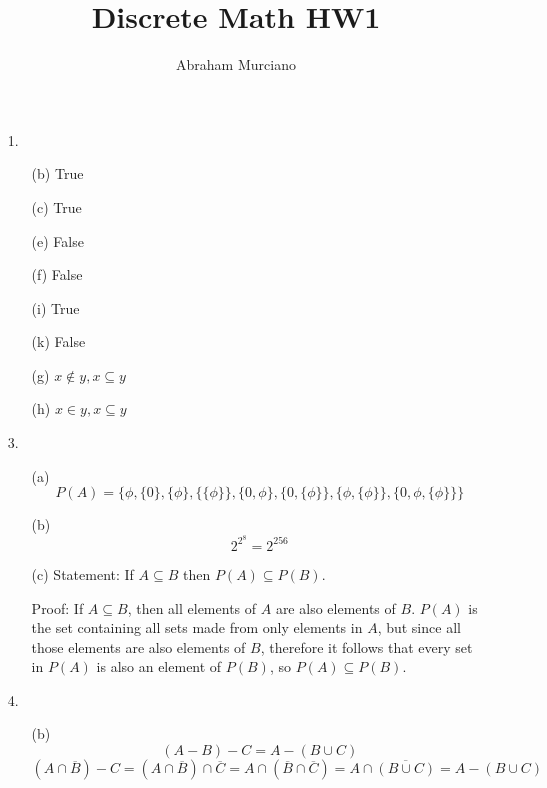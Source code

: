 \documentclass{article}
\title{Discrete Math HW1}
\author{Abraham Murciano}
\begin{document}
\maketitle

\begin{enumerate}
	\item[1.]
		\begin{enumerate}
			\item[(b)]
				True
			\item[(c)]
				True
			\item[(e)]
				False
			\item[(f)]
				False
			\item[(i)]
				True
			\item[(k)]
				False
		\end{enumerate}
		
		\begin{enumerate}
			\item[(g)]
				\(x \notin y, x \subseteq y\)
			\item[(h)]
				\(x \in y, x \subseteq y\)
		\end{enumerate}
		
	\item[3.]
		\begin{enumerate}
			\item[(a)]
				\[P(A) = \{ \phi, \{0\}, \{\phi\}, \{\{\phi\}\}, \{0, \phi\}, \{0, \{\phi\}\}, \{\phi, \{\phi\}\}, \{0, \phi, \{\phi\}\}\}\]
			
			\item[(b)]
				\[2^{2^{8}} = 2^{256}\]
			
			\item[(c)]
				Statement: If \(A \subseteq B\) then \(P(A) \subseteq P(B) \).

				Proof: If \(A \subseteq B \), then all elements of \(A\) are also elements of \(B\). \(P(A)\) is the set containing all sets made from only elements in \(A\), but since all those elements are also elements of \(B\), therefore it follows that every set in \(P(A)\) is also an element of \(P(B) \), so \(P(A) \subseteq P(B) \).
		\end{enumerate}
		
	\item[4.]
		\begin{enumerate}
			\item[(b)]
				\[(A-B)-C = A-(B \cup C)\]
				\[(A \cap \overline{B})-C = (A \cap \overline{B}) \cap \overline{C} = A \cap (\overline{B} \cap \overline{C}) = A \cap \overline{(B \cup C)} = A - (B \cup C)\]
			

\end{enumerate}
\end{enumerate}
\end{document}
